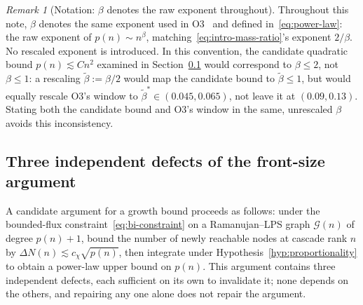 \documentclass[11pt,a4paper]{article}
\theoremstyle{definition}
\theoremstyle{remark}
\newtheorem{remark}[theorem]{Remark}
\begin{document}
    \begin{remark}[Notation: $\beta$ denotes the raw exponent throughout]
      \label{rem:beta-convention}
      Throughout this note, $\beta$ denotes the same exponent used in
      O3~\cite{Beau2026a7} and defined in~\eqref{eq:power-law}: the raw exponent of
      $p(n) \sim n^\beta$, matching~\eqref{eq:intro-mass-ratio}'s exponent $2/\beta$.
      No rescaled exponent is introduced.
      In this convention, the candidate quadratic bound $p(n) \lesssim C n^2$ examined in
      Section~\ref{ssec:defects} would correspond to $\beta \leq 2$, not $\beta \leq 1$: a
      rescaling $\tilde\beta := \beta/2$ would map the candidate bound to $\tilde\beta \leq 1$,
      but would equally rescale O3's window to $\tilde\beta^* \in (0.045, 0.065)$, not leave it
      at $(0.09, 0.13)$.
      Stating both the candidate bound and O3's window in the same, unrescaled $\beta$ avoids
      this inconsistency.
    \end{remark}

  \subsection{Three independent defects of the front-size argument}
    \label{ssec:defects}

    A candidate argument for a growth bound proceeds as follows: under the bounded-flux
    constraint~\eqref{eq:bi-constraint} on a Ramanujan--LPS graph $\mathcal{G}(n)$ of degree
    $p(n)+1$, bound the number of newly reachable nodes at cascade rank $n$ by
    $\Delta N(n) \lesssim c_\chi \sqrt{p(n)}$, then integrate under
    Hypothesis~\ref{hyp:proportionality} to obtain a power-law upper bound on $p(n)$.
    This argument contains three independent defects, each sufficient on its own to
    invalidate it; none depends on the others, and repairing any one alone does not repair
    the argument.
\end{document}
